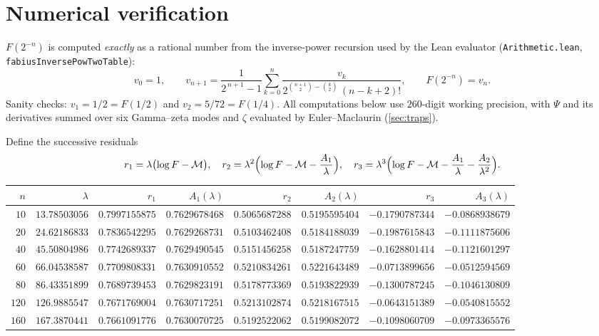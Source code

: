 \documentclass[11pt,oneside]{article}
\theoremstyle{definition}
\theoremstyle{remark}
\begin{document}
\section{Numerical verification}\label{sec:numerics}

$F(2^{-n})$ is computed \emph{exactly} as a rational number from the
inverse-power recursion used by the Lean evaluator
(\nolinkurl{Arithmetic.lean}, \lstinline[style=pseudo]{fabiusInversePowTwoTable}):
\[
  v_0=1,\qquad
  v_{n+1}=\frac{1}{2^{\,n+1}-1}
    \sum_{k=0}^{n}\frac{v_k}{2^{\binom{n+1}{2}-\binom{k}{2}}\,(n-k+2)!},
  \qquad F(2^{-n})=v_n.
\]
Sanity checks: $v_1=1/2=F(1/2)$ and $v_2=5/72=F(1/4)$.  All computations below
use $260$-digit working precision, with $\Psi$ and its derivatives summed over
six Gamma--zeta modes and $\zeta$ evaluated by Euler--Maclaurin
(\cref{sec:traps}).

Define the successive residuals
\[
  r_1=\lambda\bigl(\log F-\mathcal M\bigr),\quad
  r_2=\lambda^2\Bigl(\log F-\mathcal M-\frac{A_1}{\lambda}\Bigr),\quad
  r_3=\lambda^3\Bigl(\log F-\mathcal M-\frac{A_1}{\lambda}-\frac{A_2}{\lambda^2}\Bigr).
\]

\begin{center}\small
\begin{tabular}{@{}rrrrrrrr@{}}
\toprule
$n$ & $\lambda$ & $r_1$ & $A_1(\lambda)$ & $r_2$ & $A_2(\lambda)$ & $r_3$ & $A_3(\lambda)$\\
\midrule
$10$ & $13.78503056$ & $0.7997155875$ & $0.7629678468$ & $0.5065687288$ & $0.5195595404$ & $-0.1790787344$ & $-0.0868938679$\\
$20$ & $24.62186833$ & $0.7836542295$ & $0.7629268731$ & $0.5103462408$ & $0.5184188039$ & $-0.1987615843$ & $-0.1111875606$\\
$40$ & $45.50804986$ & $0.7742689337$ & $0.7629490545$ & $0.5151456258$ & $0.5187247759$ & $-0.1628801414$ & $-0.1121601297$\\
$60$ & $66.04538587$ & $0.7709808331$ & $0.7630910552$ & $0.5210834261$ & $0.5221643489$ & $-0.0713899656$ & $-0.0512594569$\\
$80$ & $86.43351899$ & $0.7689739453$ & $0.7629823191$ & $0.5178773369$ & $0.5193822939$ & $-0.1300787245$ & $-0.1046130809$\\
$120$ & $126.9885547$ & $0.7671769004$ & $0.7630717251$ & $0.5213102874$ & $0.5218167515$ & $-0.0643151389$ & $-0.0540815552$\\
$160$ & $167.3870441$ & $0.7661091776$ & $0.7630070725$ & $0.5192522062$ & $0.5199082072$ & $-0.1098060709$ & $-0.0973365576$\\
\bottomrule
\end{tabular}
\end{center}
\end{document}

